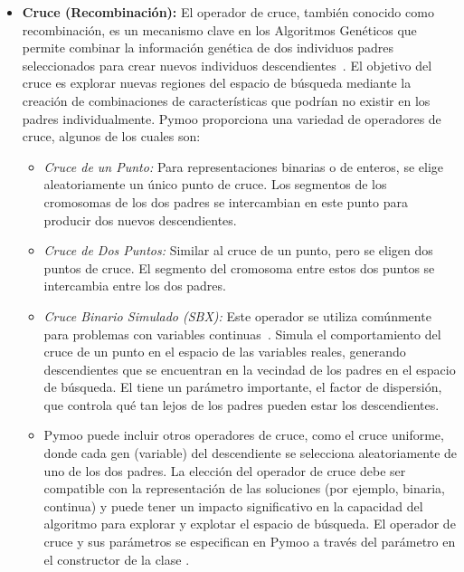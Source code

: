 \begin{itemize}[label=\textbullet, leftmargin=*]
    \item \textbf{Cruce (Recombinación):} El operador de cruce, también conocido como recombinación, es un mecanismo clave en los Algoritmos Genéticos que permite combinar la información genética de dos individuos padres seleccionados para crear nuevos individuos descendientes~\cite{goldberg1989}. El objetivo del cruce es explorar nuevas regiones del espacio de búsqueda mediante la creación de combinaciones de características que podrían no existir en los padres individualmente. Pymoo proporciona una variedad de operadores de cruce, algunos de los cuales son:
    \begin{itemize}[label=\textbullet, leftmargin=*] %
        \item \textit{Cruce de un Punto:} Para representaciones binarias o de enteros, se elige aleatoriamente un único punto de cruce. Los segmentos de los cromosomas de los dos padres se intercambian en este punto para producir dos nuevos descendientes.
        \item \textit{Cruce de Dos Puntos:} Similar al cruce de un punto, pero se eligen dos puntos de cruce. El segmento del cromosoma entre estos dos puntos se intercambia entre los dos padres.
        \item \textit{Cruce Binario Simulado (SBX):} Este operador se utiliza comúnmente para problemas con variables continuas~\cite{deb1995}. Simula el comportamiento del cruce de un punto en el espacio de las variables reales, generando descendientes que se encuentran en la vecindad de los padres en el espacio de búsqueda. El \texttt{} tiene un parámetro importante, el factor de dispersión, que controla qué tan lejos de los padres pueden estar los descendientes.
        \item Pymoo puede incluir otros operadores de cruce, como el cruce uniforme, donde cada gen (variable) del descendiente se selecciona aleatoriamente de uno de los dos padres. La elección del operador de cruce debe ser compatible con la representación de las soluciones (por ejemplo, binaria, continua) y puede tener un impacto significativo en la capacidad del algoritmo para explorar y explotar el espacio de búsqueda. El operador de cruce y sus parámetros se especifican en Pymoo a través del parámetro \texttt{} en el constructor de la clase \texttt{}.
    \end{itemize}


\end{itemize}
